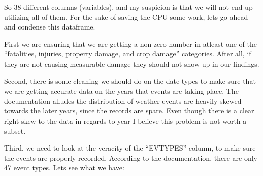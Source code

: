 \documentclass[
]{article}
\newenvironment{Shaded}{\begin{snugshade}}{\end{snugshade}}
\newcommand{\AttributeTok}[1]{\textcolor[rgb]{0.77,0.63,0.00}{#1}}
\newcommand{\DecValTok}[1]{\textcolor[rgb]{0.00,0.00,0.81}{#1}}
\newcommand{\FunctionTok}[1]{\textcolor[rgb]{0.00,0.00,0.00}{#1}}
\newcommand{\NormalTok}[1]{#1}
\newcommand{\OtherTok}[1]{\textcolor[rgb]{0.56,0.35,0.01}{#1}}
\newcommand{\SpecialCharTok}[1]{\textcolor[rgb]{0.00,0.00,0.00}{#1}}
\newcommand{\StringTok}[1]{\textcolor[rgb]{0.31,0.60,0.02}{#1}}
\begin{document}
So 38 different columns (variables), and my suspicion is that we will
not end up utilizing all of them. For the sake of saving the CPU some
work, lets go ahead and condense this dataframe.

First we are ensuring that we are getting a non-zero number in atleast
one of the ``fatalities, injuries, property damage, and crop damage''
categories. After all, if they are not causing measurable damage they
should not show up in our findings.

Second, there is some cleaning we should do on the date types to make
sure that we are getting accurate data on the years that events are
taking place. The documentation alludes the distribution of weather
events are heavily skewed towards the later years, since the records are
spare. Even though there is a clear right skew to the data in regards to
year I believe this problem is not worth a subset.

Third, we need to look at the veracity of the ``EVTYPES'' column, to
make sure the events are properly recorded. According to the
documentation, there are only 47 event types. Lets see what we have:

\begin{Shaded}
\end{Shaded}
\end{document}
